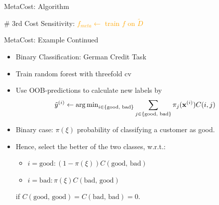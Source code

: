 \documentclass[11pt,compress,t,notes=noshow, xcolor=table]{beamer}
\begin{document}
\begin{vbframe}{MetaCost: Algorithm}
{\begin{minipage}{0.45\textwidth}
\begin{algorithmic}
			   \State \# 3rd Cost Sensitivity:
%				
				\textcolor{orange}{\State $f_{meta} \leftarrow$ train $f$ on $\tilde D$}
%			
			\end{algorithmic}
		\end{minipage}
	}
\end{vbframe}


\begin{vbframe}{MetaCost: Example Continued}


        \begin{itemize}
            \item Binary Classification: German Credit Task                     
            \item Train random forest with threefold cv
            \item Use OOB-predictions to calculate new labels by
            \begin{equation*}
                \tilde y^{(i)} \leftarrow \operatorname{arg\,min}_{i \in \{\text{good, bad}\}} \sum_{j \in \{\text{good, bad}\}} \pi_j(\mathbf{x}^{(i)}) C(i,j)
            \end{equation*}
            \item Binary case: $\pi(\xi)$ probability of classifying a customer as good.
            \item Hence, select the better of the two classes, w.r.t.:
             \begin{itemize}
               \item $i = \text{good}: (1-\pi(\xi)) C(\text{good, bad})$
               \vspace{5pt}
               \item $i = \text{bad}: \pi(\xi) C(\text{bad, good})$
               \vspace{5pt}
             \end{itemize}
               \vspace{5pt}
            if $C(\text{good, good}) = C(\text{bad, bad}) = 0$.
        \end{itemize}

\end{vbframe}



%
\endlecture
\end{document}
